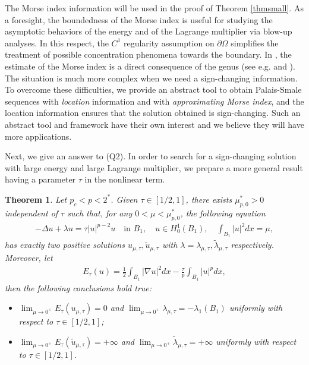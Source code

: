 \documentclass[10pt,a4paper]{article}
\newtheorem{theorem}{Theorem}[section]
\theoremstyle{definition} \theoremstyle{remark}
\numberwithin{equation}{section}
\newcommand{\la}{\lambda}
\begin{document}
\vskip0.1in

The Morse index information will be used in the proof of Theorem \ref{thmsmall}. As a foresight,  the boundedness of the  Morse index  is useful for studying the asymptotic behaviors of the energy and of the Lagrange multiplier via blow-up analyses. In this respect, the $C^1$ regularity assumption on $\partial \Omega$ simplifies the treatment of possible concentration phenomena towards the boundary. In \cite{PV}, the estimate of the Morse index is a direct consequence of the  genus (see e.g. \cite{BL} and \cite{Sol}). The situation is much more complex when we need a sign-changing  information.  {To overcome these difficulties,   we provide an abstract tool to obtain Palais-Smale sequences with \emph{location} information and with \emph{approximating Morse index}, and the location information ensures that the solution obtained is sign-changing. Such an abstract tool and framework  have their own interest and we believe they will have more applications.}





\vskip0.1in
Next, we give an answer to (Q2). In order to search for a sign-changing solution with large energy and large Lagrange multiplier, we prepare  a more general result having a parameter $\tau$ in the nonlinear term.

\begin{theorem} \label{thmunique}
	Let $p_c < p < 2^*$. Given $\tau \in [1/2,1]$, there exists $\mu^*_{p,0} > 0$ independent of $\tau$ such that, for any $0 < \mu < \mu^*_{p,0}$, the following equation
	\begin{align} \label{eqequationtau}
		-\Delta u + \la u = \tau|u|^{p-2}u \quad \text{in } B_1, \quad u \in H_0^1(B_1), \quad \int_{B_1}|u|^2dx = \mu,
	\end{align}
	has exactly two positive solutions $u_{\mu,\tau}, \tilde u_{\mu,\tau}$ with $\la=\la_{\mu,\tau},\tilde\la_{ \mu,\tau}$ respectively. Moreover, let
	\begin{align*}
		E_\tau(u) = \frac12 \int_{B_1}|\nabla u|^2dx - \frac{\tau}p\int_{B_1} |u|^pdx,
	\end{align*}
then the following conclusions hold true:
	\begin{itemize}
		\item[(i)] $\displaystyle \lim_{\mu \to 0^+} E_\tau(u_{\mu,\tau}) = 0$ and $\displaystyle \lim_{\mu \to 0^+} \la_{\mu,\tau} = -\la_1(B_1)$ uniformly with respect to $\tau \in [1/2,1]$;
		\item[(ii)] $\displaystyle \lim_{\mu \to 0^+}  E_\tau(\tilde u_{\mu,\tau})= +\infty$ and $\displaystyle \lim_{\mu \to 0^+}  \tilde\la_{\mu,\tau} = +\infty$ uniformly with respect to $\tau \in [1/2,1]$.
	\end{itemize}	
\end{theorem}
\end{document}
